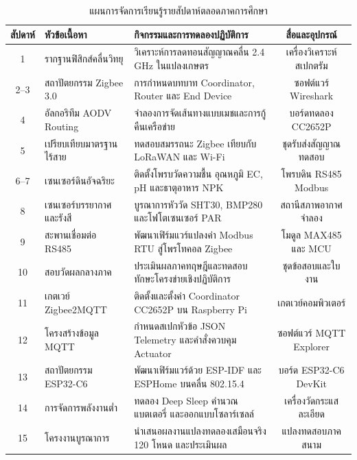 \begin{table}[H]
\caption{แผนการจัดการเรียนรู้รายสัปดาห์ตลอดภาคการศึกษา}
\label{tab:syllabus_schedule}
\centering
\small
\begin{tabularx}{\textwidth}{c p{3.2cm} >{\raggedright\arraybackslash}X c}
\toprule
\textbf{สัปดาห์} & \textbf{หัวข้อเนื้อหา} & \textbf{กิจกรรมและการทดลองปฏิบัติการ} & \textbf{สื่อและอุปกรณ์} \\
\midrule
1 & รากฐานฟิสิกส์คลื่นวิทยุ & วิเคราะห์การลดทอนสัญญาณคลื่น 2.4 GHz ในแปลงเกษตร & เครื่องวิเคราะห์สเปกตรัม \\
2--3 & สถาปัตยกรรม Zigbee 3.0 & การกำหนดบทบาท Coordinator, Router และ End Device & ซอฟต์แวร์ Wireshark \\
4 & อัลกอริทึม AODV Routing & จำลองการจัดเส้นทางแบบเมชและการกู้คืนเครือข่าย & บอร์ดทดลอง CC2652P \\
5 & เปรียบเทียบมาตรฐานไร้สาย & ทดสอบสมรรถนะ Zigbee เทียบกับ LoRaWAN และ Wi-Fi & ชุดรับส่งสัญญาณทดสอบ \\
6--7 & เซนเซอร์ดินอัจฉริยะ & ติดตั้งโพรบวัดความชื้น อุณหภูมิ EC, pH และธาตุอาหาร NPK & โพรบดิน RS485 Modbus \\
8 & เซนเซอร์บรรยากาศและรังสี & บูรณาการหัววัด SHT30, BMP280 และโฟโตเซนเซอร์ PAR & สถานีสภาพอากาศจำลอง \\
9 & สะพานเชื่อมต่อ RS485 & พัฒนาเฟิร์มแวร์แปลงค่า Modbus RTU สู่โพรโทคอล Zigbee & โมดูล MAX485 และ MCU \\
10 & สอบวัดผลกลางภาค & ประเมินผลภาคทฤษฎีและทดสอบทักษะโครงข่ายเชิงปฏิบัติการ & ชุดข้อสอบและใบงาน \\
11 & เกตเวย์ Zigbee2MQTT & ติดตั้งและตั้งค่า Coordinator CC2652P บน Raspberry Pi & เกตเวย์คอมพิวเตอร์ \\
12 & โครงสร้างข้อมูล MQTT & กำหนดสเปกหัวข้อ JSON Telemetry และคำสั่งควบคุม Actuator & ซอฟต์แวร์ MQTT Explorer \\
13 & สถาปัตยกรรม ESP32-C6 & พัฒนาเฟิร์มแวร์ด้วย ESP-IDF และ ESPHome บนคลื่น 802.15.4 & บอร์ด ESP32-C6 DevKit \\
14 & การจัดการพลังงานต่ำ & ทดลอง Deep Sleep คำนวณแบตเตอรี่ และออกแบบโซลาร์เซลล์ & เครื่องวัดกระแสละเอียด \\
15 & โครงงานบูรณาการ & นำเสนอผลงานแปลงทดลองเสมือนจริง 120 โหนด และประเมินผล & แปลงทดสอบภาคสนาม \\
\bottomrule
\end{tabularx}
\end{table}

\clearpage
